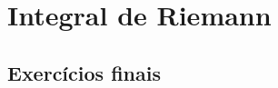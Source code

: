 
\chapter{Integral de Riemann}\label{cap:integral_de_Riemann}

\emconstrucao

\section{Exercícios finais}

\construirExer
